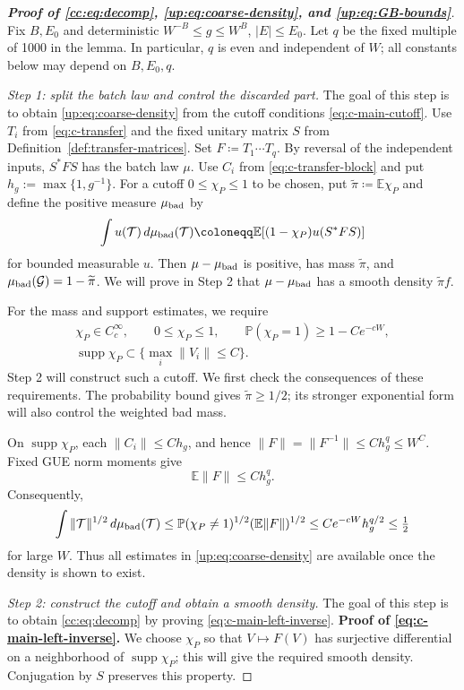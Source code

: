 \documentclass[11pt]{article}
\numberwithin{equation}{section}
\theoremstyle{remark}
\newcommand{\E}{\mathbb E}
\newcommand{\Prob}{\mathbb P}
\newcommand{\supp}{\operatorname{supp}}
\begin{document}
\begin{proof}[\textbf{Proof of \eqref{cc:eq:decomp}, \eqref{up:eq:coarse-density}, and \eqref{up:eq:GB-bounds}}]
Fix $B,E_0$ and deterministic $W^{-B}\le g\le W^B$, $|E|\le E_0$.
Let $q$ be the fixed multiple of 1000 in the lemma. In particular,
$q$ is even and independent of $W$; all constants below may depend
on $B,E_0,q$.

\medskip\noindent\emph{Step 1: split the batch law and control the discarded part.}
The goal of this step is to obtain \eqref{up:eq:coarse-density}
from the cutoff conditions \eqref{eq:c-main-cutoff}.
Use $T_i$ from \eqref{eq:c-transfer} and the fixed unitary matrix
$S$ from Definition~\ref{def:transfer-matrices}. Set
$F\coloneqq T_1\cdots T_q$. By reversal of the independent inputs,
$S^*FS$ has the batch law $\mu$. Use $C_i$ from \eqref{eq:c-transfer-block}
and put $h_g:=\max\{1,g^{-1}\}$.
For a cutoff $0\le\chi_P\le1$ to be chosen, put
$\widetilde\pi\coloneqq\E\chi_P$ and define the positive measure
$\mu_{\rm bad}$ by
\[
 \int u(\mathcal T)\,d\mu_{\rm bad}(\mathcal T)
 \coloneqq\E[(1-\chi_P)u(S^*FS)]
\]
for bounded measurable $u$. Then
$\mu-\mu_{\rm bad}$ is positive, has mass $\widetilde\pi$, and
$\mu_{\rm bad}(\mathcal G)=1-\widetilde\pi$.
We will prove in Step 2 that $\mu-\mu_{\rm bad}$ has a smooth density
$\widetilde\pi f$.

For the mass and support estimates, we require
\[
 \begin{gathered}
 \chi_P\in C_c^\infty,\qquad 0\le\chi_P\le1,\qquad
 \Prob(\chi_P=1)\ge1-Ce^{-cW},\\
 \supp\chi_P\subset\{\max_i\|V_i\|\le C\}.
 \end{gathered}
\]
Step 2 will construct such a cutoff. We first check the consequences
of these requirements. The probability bound gives $\widetilde\pi\ge1/2$;
its stronger exponential form will also control the weighted bad mass.

On $\supp\chi_P$, each $\|C_i\|\le Ch_g$, and hence
$\|F\|=\|F^{-1}\|\le Ch_g^q\le W^C$. Fixed GUE norm moments give
\[
 \E\|F\|\le Ch_g^q.
\]
Consequently,
\[
 \int\|\mathcal T\|^{1/2}\,d\mu_{\rm bad}(\mathcal T)
 \le\Prob(\chi_P\ne1)^{1/2}(\E\|F\|)^{1/2}
 \le Ce^{-cW}h_g^{q/2}\le\tfrac12
\]
for large $W$. Thus all estimates in \eqref{up:eq:coarse-density}
are available once the density is shown to exist.

\medskip\noindent\emph{Step 2: construct the cutoff and obtain a smooth density.}
The goal of this step is to obtain \eqref{cc:eq:decomp} by proving
\eqref{eq:c-main-left-inverse}.
\smallskip\noindent\textbf{Proof of \eqref{eq:c-main-left-inverse}.}
We choose $\chi_P$ so that $V\mapsto F(V)$ has surjective differential
on a neighborhood of $\supp\chi_P$; this will give the required smooth
density. Conjugation by $S$ preserves this property.


\end{proof}
\end{document}
